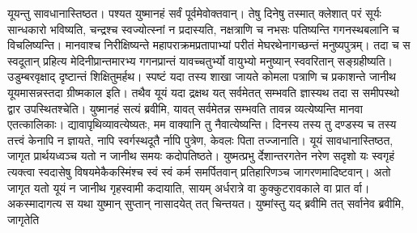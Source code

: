 \vakya यूयन्तु सावधानास्तिष्ठत। पश्यत युष्मानहं सर्वं पूर्वमेवोक्तवान्।
\vakya तेषु दिनेषु तस्मात् क्लेशात् परं सूर्यः सान्धकारो भविष्यति, चन्द्रश्च स्वज्योत्स्नां न प्रदास्यति,
\vakya नक्षत्राणि च नभसः पतिष्यन्ति गगनस्थबलानि च विचलिष्यन्ति।
\vakya मानवाश्च निरीक्षिष्यन्ते महापराक्रमप्रतापाभ्यां परीतं मेघरथेनागच्छन्तं मनुष्यपुत्रम्।
\vakya तदा च स स्वदूतान् प्रहित्य मेदिनीप्रान्तमारभ्य गगनप्रान्तं यावच्चतुर्भ्यो वायुभ्यो मनुष्यान् स्ववरितान् सङ्ग्रहीष्यति।
\vakya उडुम्बरवृक्षाद् दृष्टान्तं शिक्षितुमर्हथ। स्पष्टं यदा तस्य शाखा जायते कोमला पत्राणि च प्रकाशन्ते जानीथ यूयमासन्नस्तदा ग्रीष्मकाल इति।
\vakya तथैव यूयं यदा द्रक्षथ यत् सर्वमेतत् सम्भवति ज्ञास्यथ तदा स समीपस्थो द्वार उपस्थितश्चेति।
\vakya युष्मानहं सत्यं ब्रवीमि, यावत् सर्वमेतन्न सम्भवति तावन्न व्यत्येष्यन्ति मानवा एतत्कालिकाः।
\vakya द्यावापृथिव्यावत्येष्यतः, मम वाक्यानि तु नैवात्येष्यन्ति।
\vakya दिनस्य तस्य तु दण्डस्य च तस्य तत्त्वं केनापि न ज्ञायते, नापि स्वर्गस्थदूतै र्नापि पुत्रेण, केवलः पिता तज्जानाति।
\vakya यूयं सावधानास्तिष्ठत, जागृत प्रार्थयध्वञ्च यतो न जानीथ समयः कदोपतिष्ठते।
\vakya युष्मत्प्रभु र्देशान्तरगतेन नरेण सदृशो यः स्वगृहं त्यक्त्वा स्वदासेषु विषयमेकैकस्मिंश्च स्वं स्वं कर्म समर्पितवान् प्रतिहारिणञ्च जागरणमादिष्टवान्।
\vakya अतो जागृत यतो यूयं न जानीथ गृहस्वामी कदायाति, सायम् अर्धरात्रे वा कुक्कुटरावकाले वा प्रात र्वा।
\vakya अकस्मादागत्य स यथा युष्मान् सुप्तान् नासादयेत् तत् चिन्तयत।
\vakya युष्मांस्तु यद् ब्रवीमि तत् सर्वानेव ब्रवीमि, जागृतेति\eoc